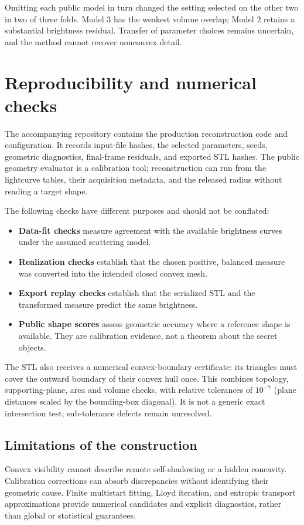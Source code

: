 \documentclass[11pt,a4paper]{article}
\begin{document}
Omitting each public model in turn changed the setting selected on the other two in two of three folds. Model 3 has the weakest volume overlap; Model 2 retains a substantial brightness residual. Transfer of parameter choices remains uncertain, and the method cannot recover nonconvex detail.

\clearpage
\section{Reproducibility and numerical checks}
The accompanying repository contains the production reconstruction code and configuration. It records input-file hashes, the selected parameters, seeds, geometric diagnostics, final-frame residuals, and exported STL hashes. The public geometry evaluator is a calibration tool; reconstruction can run from the lightcurve tables, their acquisition metadata, and the released radius without reading a target shape.

The following checks have different purposes and should not be conflated:
\begin{itemize}
\item \textbf{Data-fit checks} measure agreement with the available brightness curves under the assumed scattering model.
\item \textbf{Realization checks} establish that the chosen positive, balanced measure was converted into the intended closed convex mesh.
\item \textbf{Export replay checks} establish that the serialized STL and the transformed measure predict the same brightness.
\item \textbf{Public shape scores} assess geometric accuracy where a reference shape is available. They are calibration evidence, not a theorem about the secret objects.
\end{itemize}

The STL also receives a numerical convex-boundary certificate: its triangles must cover the outward boundary of their convex hull once. This combines topology, supporting-plane, area and volume checks, with relative tolerances of $10^{-7}$ (plane distances scaled by the bounding-box diagonal). It is not a generic exact intersection test; sub-tolerance defects remain unresolved.

\subsection*{Limitations of the construction}
Convex visibility cannot describe remote self-shadowing or a hidden concavity. Calibration corrections can absorb discrepancies without identifying their geometric cause. Finite multistart fitting, Lloyd iteration, and entropic transport approximations provide numerical candidates and explicit diagnostics, rather than global or statistical guarantees.

\vspace{3pt}
{\small


}
\end{document}
